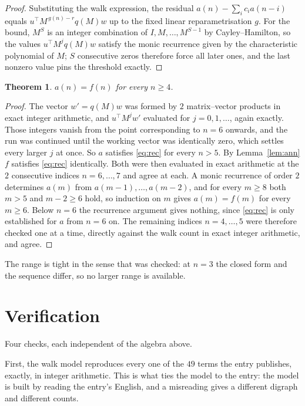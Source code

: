 \documentclass[11pt,a4paper]{article}
\theoremstyle{plain}
\newtheorem{theorem}{Theorem}
\theoremstyle{definition}
\begin{document}
\begin{proof}
Substituting the walk expression, the residual $a(n)-\sum_ic_ia(n-i)$ equals
$u^{\!\top}M^{\,g(n)-r}q(M)w$ up to the fixed linear reparametrisation $g$. For the bound,
$M^{S}$ is an integer combination of $I,M,\dots,M^{S-1}$ by Cayley--Hamilton, so the values
$u^{\!\top}M^{j}q(M)w$ satisfy the monic recurrence given by the characteristic polynomial of
$M$; $S$ consecutive zeros therefore force all later ones, and the last nonzero value pins the
threshold exactly.
\end{proof}

\begin{theorem}
$a(n)=f(n)$ for every $n\ge4$.
\end{theorem}

\begin{proof}
The vector $w'=q(M)w$ was formed by $2$ matrix--vector products in exact integer
arithmetic, and $u^{\!\top}M^{j}w'$ evaluated for $j=0,1,\dots$, again exactly. Those integers
vanish from the point corresponding to $n=6$ onwards, and the run was continued until the
working vector was identically zero, which settles every larger $j$ at once. So $a$ satisfies
\eqref{eq:rec} for every $n>5$. By Lemma~\ref{lem:ann} $f$ satisfies \eqref{eq:rec}
identically. Both were then evaluated in exact arithmetic at the $2$ consecutive indices
$n=6,\dots,7$ and agree at each. A monic recurrence of order $2$
determines $a(m)$ from $a(m-1),\dots,a(m-2)$, and for every $m\ge8$ both
$m>5$ and $m-2\ge6$ hold, so induction on $m$ gives $a(m)=f(m)$ for every
$m\ge6$.
Below $n=6$ the recurrence argument gives nothing, since \eqref{eq:rec} is only
established for $a$ from $n=6$ on. The remaining indices $n=4,\dots,5$ were
therefore checked one at a time, directly against the walk count in exact integer arithmetic,
and agree.
\end{proof}

The range is tight in the sense that was checked: at $n=3$ the closed form and the sequence differ, so no larger range is available.

\section{Verification}

Four checks, each independent of the algebra above.

First, the walk model reproduces every one of the $49$ terms the entry publishes,
exactly, in integer arithmetic. This is what ties the model to the entry: the model is built
by reading the entry's English, and a misreading gives a different digraph and different
counts.
\end{document}
